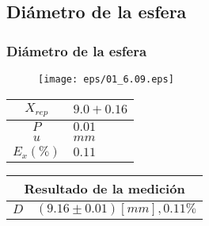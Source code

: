 \documentclass[letter,11pt]{beamer}
\begin{document}
\subsection{Diámetro de la esfera}
\begin{frame}
\frametitle{Diámetro de la esfera}
\vspace*{0.8cm}
\begin{figure}
\centering
\texttt{[image: eps/01\_6.09.eps]}
\end{figure}
\vspace*{0.4cm}
\scriptsize
\begin{tabular}{|c|>{\centering}m{1.8cm}<{\centering}|}
\hline
$X_{rep}$ &  $9.0+0.16$ \tabularnewline \hline
      $P$ &      $0.01$ \tabularnewline \hline
      $u$ &        $mm$ \tabularnewline \hline
$E_x(\%)$ &      $0.11$ \tabularnewline \hline
\end{tabular}
\quad
\begin{tabular}{|c|>{\centering}m{5.7cm}<{\centering}|}
\hline
\multicolumn{2}{|c|}{\textbf{Resultado de la medición}} \\ \hline
$D$ & $( 9.16\pm0.01)[mm], 0.11\%$ \tabularnewline \hline
\end{tabular}
\end{frame}
\end{document}
